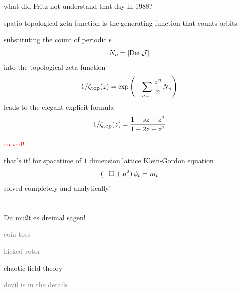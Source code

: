 \begin{frame}{what did Fritz not understand that day in 1988?}

{\color{orange}spatio}{\templatt} topological zeta function
is the generating function that counts {\color{blue}orbits}
\medskip

substituting the {\color{blue}\HillDet} count of periodic {\lattstate}s
\[
N_n=|\mbox{\rm Det}\,{\cal J}|
\]
into the
{topological} zeta func\-tion
\[
1/\zeta_{\mbox{\footnotesize top}} (z)
  =   \exp \left(
    -\sum_{n=1} \frac{z^n}{n} N_n
    \right)
\]%
leads to the elegant explicit formula
\[
1/\zeta_{\mbox{\footnotesize top}} (z)
 =  \frac{1 - s z + z^2}
         {1 - 2 z + z^2}
\]%


\vfill\hfill
{\Huge \textcolor{red}{solved!}}
\end{frame} %

\begin{frame}{that's it! for spacetime of $1$ dimension}
lattice Klein-Gordon equation
    {\Huge
\[
  (-\Box + {\mu}^2)\,\phi_{t} = m_t
\] %
    }
\hfill solved completely and analytically!
\end{frame} %

\section[\catlatt]
 {\catlatt}
\label{s:catLatt}

\begin{frame}{}
\begin{bartlett}{
Du mu{\ss}t es dreimal sagen!
        }
\end{bartlett}
\vfill
\begin{enumerate}
              \item \textcolor{gray}{\small
coin toss
              \item
kicked rotor
                  }
              \item {\Large
chaotic field theory
                  }\textcolor{gray}{\small
              \item
devil is in the details
                    }
            \end{enumerate}
\end{frame} %

